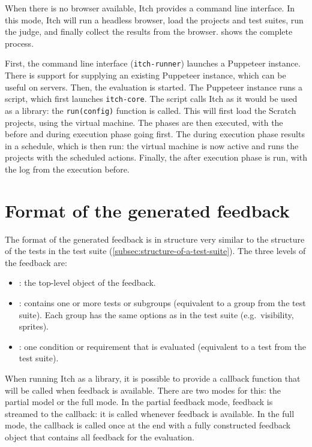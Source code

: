 \documentclass[../main]{subfiles}
\begin{document}
When there is no browser available, Itch provides a command line interface.
In this mode, Itch will run a headless browser, load the projects and test suites, run the judge, and finally collect the results from the browser.
 shows the complete process.

First, the command line interface (\texttt{itch-runner}) launches a Puppeteer instance.
There is support for supplying an existing Puppeteer instance, which can be useful on servers.
Then, the evaluation is started.
The Puppeteer instance runs a script, which first launches \texttt{itch-core}.
The script calls Itch as it would be used as a library: the \texttt{run(config)} function is called.
This will first load the Scratch projects, using the virtual machine.
The phases are then executed, with the before and during execution phase going first.
The during execution phase results in a schedule, which is then run: the virtual machine is now active and runs the projects with the scheduled actions.
Finally, the after execution phase is run, with the log from the execution before.


\section{Format of the generated feedback}\label{sec:format-of-the-generated-feedback}

The format of the generated feedback is in structure very similar to the structure of the tests in the test suite (\cref{subsec:structure-of-a-test-suite}).
The three levels of the feedback are:

\begin{itemize}[nosep]
    \item {}: the top-level object of the feedback.
    \item {}: contains one or more tests or subgroups (equivalent to a group from the test suite). Each group has the same options as in the test suite (e.g.\ visibility, sprites).
    \item {}: one condition or requirement that is evaluated (equivalent to a test from the test suite).
\end{itemize}

When running Itch as a library, it is possible to provide a callback function that will be called when feedback is available.
There are two modes for this: the partial model or the full mode.
In the partial feedback mode, feedback is streamed to the callback: it is called whenever feedback is available.
In the full mode, the callback is called once at the end with a fully constructed feedback object that contains all feedback for the evaluation.
\end{document}
